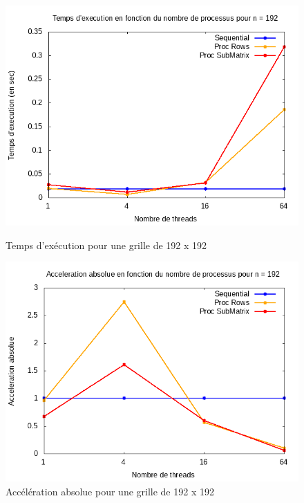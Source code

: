 \documentclass[10pt,a4paper]{article}
\begin{document}
\begin{figure}[h]
  \centering
  \begin{minipage}[b]{0.49\textwidth}
	\includegraphics[width=\textwidth]{./Time/size_192_time.png}
    \caption{Temps d'exécution pour une grille de 192 x 192}
  \end{minipage}
  \hfill
  \begin{minipage}[b]{0.49\textwidth}
    \includegraphics[width=\textwidth]{./Time/size_192_acceleration.png}
    \caption{Accélération absolue pour une grille de 192 x 192}
  \end{minipage}
\end{figure}
\end{document}
